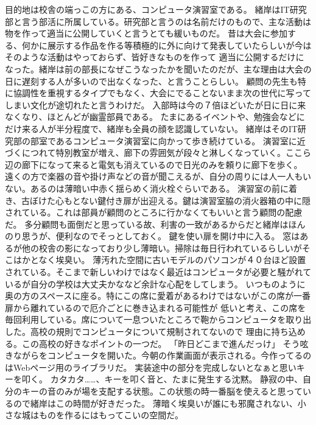 \documentclass[uplatex]{utbook}
\begin{document}
目的地は校舎の端っこの方にある、コンピュータ演習室である。
緒岸はIT研究部と言う部活に所属している。研究部と言うのは名前だけのもので、主な活動は物を作って適当に公開していくと言うとても緩いものだ。
昔は大会に参加する、何かに展示する作品を作る等積極的に外に向けて発表していたらしいが今はそのような活動はやっておらず、皆好きなものを作って
適当に公開するだけになった。緒岸は前の部長になぜこうなったかを聞いたのだが、主な理由は大会の日に遅刻する人が多いので出なくなった、と言うことらしい。
顧問の先生も特に協調性を重視するタイプでもなく、大会にでることないまま次の世代に写ってしまい文化が途切れたと言うわけだ。
入部時は今の７倍ほどいたが日に日に来なくなり、ほとんどが幽霊部員である。
たまにあるイベントや、勉強会などにだけ来る人が半分程度で、緒岸も全員の顔を認識していない。
緒岸はそのIT研究部の部室であるコンピュータ演習室に向かって歩き続けている。
演習室に近づくにつれて特別教室が増え、廊下の雰囲気が段々と淋しくなっていく。ここら辺の廊下になって来ると電気も消えているので日光のみを頼りに廊下を歩く。
遠くの方で楽器の音や掛け声などの音が聞こえるが、自分の周りには人一人もいない。あるのは薄暗い中赤く揺らめく消火栓ぐらいである。
演習室の前に着き、古ぼけた心もとない鍵付き扉が出迎える。鍵は演習室脇の消火器箱の中に隠されている。これは部員が顧問のところに行かなくてもいいと言う顧問の配慮だ。
多分顧問も面倒だと思っている故、利害の一致があるからだと緒岸はほんのり思うが、便利なのでそっとしておく。
鍵を使い扉を開け中に入る。
窓はあるが他の校舎の影になっており少し薄暗い。掃除は毎日行われているらしいがそこはかとなく埃臭い。
薄汚れた空間に古いモデルのパソコンが４０台ほど設置されている。そこまで新しいわけではなく最近はコンピュータが必要と騒がれているが自分の学校は大丈夫かななど余計な心配をしてしまう。
いつものように奥の方のスペースに座る。特にこの席に愛着があるわけではないがこの席が一番扉から離れているので厄介ごとに巻き込まれる可能性が
低いと考え、この席を毎回利用している。席について一息ついたところで鞄からコンピュータを取り出した。高校の規則でコンピュータについて規制されてないので
理由に持ち込める。この高校の好きなポイントの一つだ。
「昨日どこまで進んだっけ」
そう呟きながらをコンピュータを開いた。今朝の作業画面が表示される。今作ってるのはWebページ用のライブラリだ。
実装途中の部分を完成しないとなぁと思いキーを叩く。
カタカタ……、キーを叩く音と、たまに発生する沈黙。
静寂の中、自分のキーの音のみが場を支配する状態。この状態の時一番脳を使えると思っているので緒岸はこの時間が好きだった。
薄暗く埃臭いが誰にも邪魔されない、小さな城はものを作るにはもってこいの空間だ。
\end{document}
